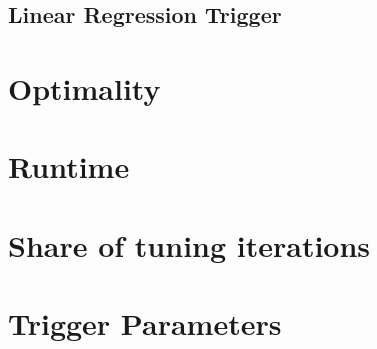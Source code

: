 \subsection{Linear Regression Trigger}


\section{Optimality}
\section{Runtime}
\section{Share of tuning iterations}
\section{Trigger Parameters}

